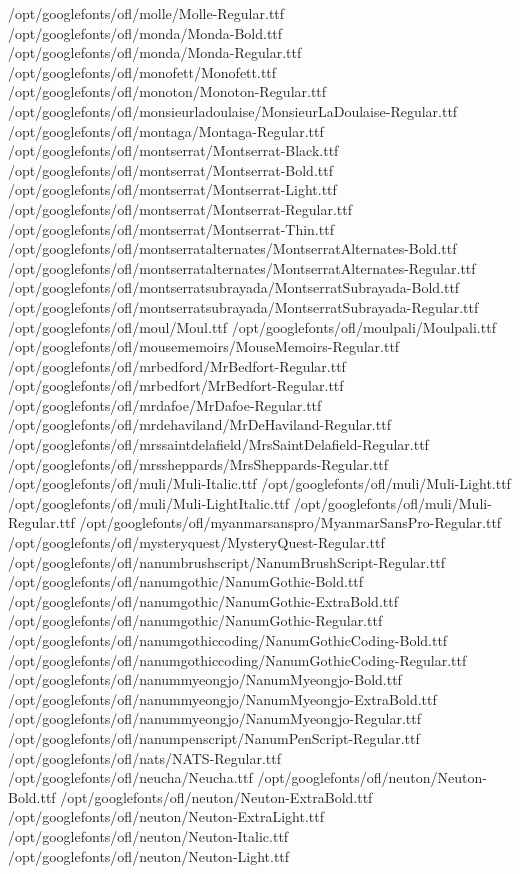 /opt/googlefonts/ofl/molle/Molle-Regular.ttf
/opt/googlefonts/ofl/monda/Monda-Bold.ttf
/opt/googlefonts/ofl/monda/Monda-Regular.ttf
/opt/googlefonts/ofl/monofett/Monofett.ttf
/opt/googlefonts/ofl/monoton/Monoton-Regular.ttf
/opt/googlefonts/ofl/monsieurladoulaise/MonsieurLaDoulaise-Regular.ttf
/opt/googlefonts/ofl/montaga/Montaga-Regular.ttf
/opt/googlefonts/ofl/montserrat/Montserrat-Black.ttf
/opt/googlefonts/ofl/montserrat/Montserrat-Bold.ttf
/opt/googlefonts/ofl/montserrat/Montserrat-Light.ttf
/opt/googlefonts/ofl/montserrat/Montserrat-Regular.ttf
/opt/googlefonts/ofl/montserrat/Montserrat-Thin.ttf
/opt/googlefonts/ofl/montserratalternates/MontserratAlternates-Bold.ttf
/opt/googlefonts/ofl/montserratalternates/MontserratAlternates-Regular.ttf
/opt/googlefonts/ofl/montserratsubrayada/MontserratSubrayada-Bold.ttf
/opt/googlefonts/ofl/montserratsubrayada/MontserratSubrayada-Regular.ttf
/opt/googlefonts/ofl/moul/Moul.ttf
/opt/googlefonts/ofl/moulpali/Moulpali.ttf
/opt/googlefonts/ofl/mousememoirs/MouseMemoirs-Regular.ttf
/opt/googlefonts/ofl/mrbedford/MrBedfort-Regular.ttf
/opt/googlefonts/ofl/mrbedfort/MrBedfort-Regular.ttf
/opt/googlefonts/ofl/mrdafoe/MrDafoe-Regular.ttf
/opt/googlefonts/ofl/mrdehaviland/MrDeHaviland-Regular.ttf
/opt/googlefonts/ofl/mrssaintdelafield/MrsSaintDelafield-Regular.ttf
/opt/googlefonts/ofl/mrssheppards/MrsSheppards-Regular.ttf
/opt/googlefonts/ofl/muli/Muli-Italic.ttf
/opt/googlefonts/ofl/muli/Muli-Light.ttf
/opt/googlefonts/ofl/muli/Muli-LightItalic.ttf
/opt/googlefonts/ofl/muli/Muli-Regular.ttf
/opt/googlefonts/ofl/myanmarsanspro/MyanmarSansPro-Regular.ttf
/opt/googlefonts/ofl/mysteryquest/MysteryQuest-Regular.ttf
/opt/googlefonts/ofl/nanumbrushscript/NanumBrushScript-Regular.ttf
/opt/googlefonts/ofl/nanumgothic/NanumGothic-Bold.ttf
/opt/googlefonts/ofl/nanumgothic/NanumGothic-ExtraBold.ttf
/opt/googlefonts/ofl/nanumgothic/NanumGothic-Regular.ttf
/opt/googlefonts/ofl/nanumgothiccoding/NanumGothicCoding-Bold.ttf
/opt/googlefonts/ofl/nanumgothiccoding/NanumGothicCoding-Regular.ttf
/opt/googlefonts/ofl/nanummyeongjo/NanumMyeongjo-Bold.ttf
/opt/googlefonts/ofl/nanummyeongjo/NanumMyeongjo-ExtraBold.ttf
/opt/googlefonts/ofl/nanummyeongjo/NanumMyeongjo-Regular.ttf
/opt/googlefonts/ofl/nanumpenscript/NanumPenScript-Regular.ttf
/opt/googlefonts/ofl/nats/NATS-Regular.ttf
/opt/googlefonts/ofl/neucha/Neucha.ttf
/opt/googlefonts/ofl/neuton/Neuton-Bold.ttf
/opt/googlefonts/ofl/neuton/Neuton-ExtraBold.ttf
/opt/googlefonts/ofl/neuton/Neuton-ExtraLight.ttf
/opt/googlefonts/ofl/neuton/Neuton-Italic.ttf
/opt/googlefonts/ofl/neuton/Neuton-Light.ttf
